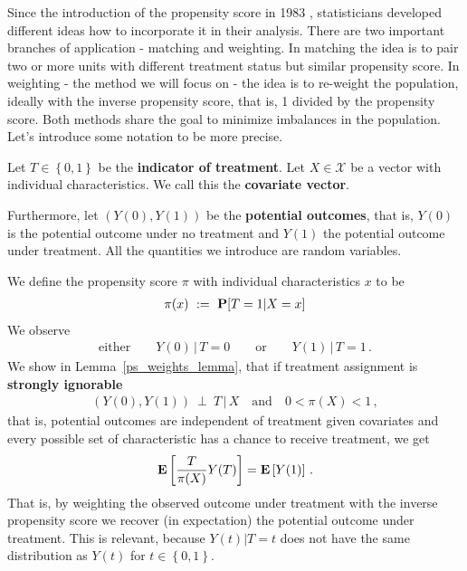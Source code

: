 Since the introduction of the propensity score in 1983 \cite{Rosenbaum1983}, statisticians developed different ideas how to incorporate it in their analysis. 
%
There are two important branches of application - matching and weighting.
In matching the idea is to pair two or more units with different treatment status but similar propensity score.
In weighting - the method we will focus on - the idea is to re-weight the population, ideally with the inverse propensity score, that is, 1 divided by the propensity score.
Both methods share the goal to minimize imbalances in the population.
Let's introduce some notation to be more precise.

Let $T\in \left\{ 0,1 \right\}$ be the \textbf{indicator of treatment}. 
Let $X\in\mathcal{X}$ be a vector with individual characteristics. We call this the \textbf{covariate vector}. 

Furthermore, let $(Y(0),Y(1))$ be the \textbf{potential outcomes}, that is, $Y(0)$ is the potential outcome under no treatment and $Y(1)$ the potential outcome under treatment.
All the quantities we introduce are random variables.

We define the propensity score $\pi$ with individual characteristics $x$ to be
\begin{gather}
\pi(x)
\ 
:=
\ 
\P[T=1|X=x]
\end{gather}
We observe  
\begin{gather}
  \text{either}
  \qquad
  Y(0)\,|\,T=0
  \qquad
  \text{or}\qquad
  Y(1)\,|\,T=1
  \,.
\end{gather}
We show in Lemma~\ref{ps_weights_lemma}, that if treatment assignment is \textbf{strongly ignorable}\cite[(1.3)]{Rosenbaum1983}
\begin{gather}
  (Y(0),Y(1))\ \perp \ T \,|\,X
  \quad
  \text{and}
  \quad
  0<\pi(X)<1
  \,,
\end{gather}
that is, 
potential outcomes are independent of treatment given covariates and every possible set of characteristic has a chance to receive treatment,
we get 
\begin{gather}
  \label{ipw}
  \mathbf{E}
  \left[ 
    \frac{T}{\pi(X)}Y(T)
  \right]
  =
  \mathbf{E}
  \left[ Y(1) \right]
  \,.
\end{gather}
That is, by weighting the observed outcome under treatment with the inverse propensity score we recover (in expectation) the potential outcome under treatment. 
This is relevant, because 
$Y(t)|T=t$ does not have the same distribution as $Y(t)$ for $t\in \left\{ 0,1 \right\}$.


